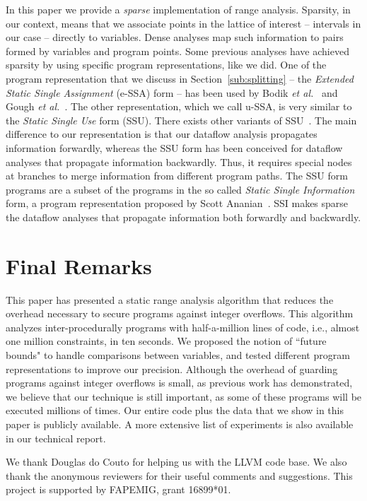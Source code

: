 \documentclass{sigplanconf}[10pt]
\begin{document}
In this paper we provide a {\em sparse} implementation of range analysis.
Sparsity, in our context, means that we associate points in the lattice of
interest -- intervals in our case -- directly to variables.
Dense analyses map such information to pairs formed by variables and program
points.
Some previous analyses have achieved sparsity by using specific program
representations, like we did.
One of the program representation that we discuss in
Section~\ref{sub:splitting} -- the {\em
Extended Static Single Assignment} (e-SSA) form -- has been used by Bodik
{\em et al.}~\cite{Bodik00} and Gough {\em et al.}~\cite{Gough94}.
The other representation, which we call u-SSA, is very similar to
the \emph{Static Single Use} form (SSU).
There exists other variants of SSU~\cite{Lo98,Plevyak96,George03}.
The main difference to our representation is that our dataflow analysis
propagates information forwardly, whereas the SSU form has been conceived for
dataflow analyses that propagate information backwardly.
Thus, it requires special nodes at branches to merge information from
different program paths.
The SSU form programs are a subset of the programs in the so called
{\em Static Single Information} form, a program representation proposed by
Scott Ananian~\cite{Ananian99}.
SSI makes sparse the dataflow analyses that propagate information both
forwardly and backwardly.

\section{Final Remarks}
\label{sec:rem}

This paper has presented a static range analysis algorithm that reduces
the overhead necessary to secure programs against integer overflows.
This algorithm analyzes inter-procedurally programs with
half-a-million lines of code, i.e., almost one million constraints, in
ten seconds.
We proposed the notion of ``future bounds" to handle comparisons
between variables, and tested different program representations to improve our
precision.
Although the overhead of guarding programs against integer overflows is small,
as previous work has demonstrated, we believe that our technique is still
important, as some of these programs will be executed millions of times.
Our entire code plus the data that we show in this paper is publicly available.
A more extensive list of experiments is also available in our technical report.

\acks
We thank Douglas do Couto for helping us with the LLVM code base.
We also thank the anonymous reviewers for their useful comments and
suggestions.
This project is supported by FAPEMIG, grant 16899*01.



\end{document}
